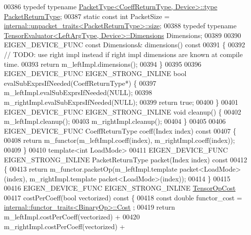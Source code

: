 \begin{DoxyCode}
00386   \textcolor{keyword}{typedef} \textcolor{keyword}{typename} \hyperlink{group___sparse_core___module}{PacketType<CoeffReturnType, Device>::type} 
      \hyperlink{group___sparse_core___module}{PacketReturnType};
00387   \textcolor{keyword}{static} \textcolor{keyword}{const} \textcolor{keywordtype}{int} PacketSize = 
      \hyperlink{struct_eigen_1_1internal_1_1unpacket__traits}{internal::unpacket\_traits<PacketReturnType>::size};
00388   \textcolor{keyword}{typedef} \textcolor{keyword}{typename} \hyperlink{struct_eigen_1_1_tensor_evaluator}{TensorEvaluator<LeftArgType, Device>::Dimensions}
       Dimensions;
00389 
00390   EIGEN\_DEVICE\_FUNC \textcolor{keyword}{const} Dimensions& dimensions()\textcolor{keyword}{ const}
00391 \textcolor{keyword}{  }\{
00392     \textcolor{comment}{// TODO: use right impl instead if right impl dimensions are known at compile time.}
00393     \textcolor{keywordflow}{return} m\_leftImpl.dimensions();
00394   \}
00395 
00396   EIGEN\_DEVICE\_FUNC EIGEN\_STRONG\_INLINE \textcolor{keywordtype}{bool} evalSubExprsIfNeeded(CoeffReturnType*) \{
00397     m\_leftImpl.evalSubExprsIfNeeded(NULL);
00398     m\_rightImpl.evalSubExprsIfNeeded(NULL);
00399     \textcolor{keywordflow}{return} \textcolor{keyword}{true};
00400   \}
00401   EIGEN\_DEVICE\_FUNC EIGEN\_STRONG\_INLINE \textcolor{keywordtype}{void} cleanup() \{
00402     m\_leftImpl.cleanup();
00403     m\_rightImpl.cleanup();
00404   \}
00405 
00406   EIGEN\_DEVICE\_FUNC CoeffReturnType coeff(Index index)\textcolor{keyword}{ const}
00407 \textcolor{keyword}{  }\{
00408     \textcolor{keywordflow}{return} m\_functor(m\_leftImpl.coeff(index), m\_rightImpl.coeff(index));
00409   \}
00410   \textcolor{keyword}{template}<\textcolor{keywordtype}{int} LoadMode>
00411   EIGEN\_DEVICE\_FUNC EIGEN\_STRONG\_INLINE PacketReturnType packet(Index index)\textcolor{keyword}{ const}
00412 \textcolor{keyword}{  }\{
00413     \textcolor{keywordflow}{return} m\_functor.packetOp(m\_leftImpl.template packet<LoadMode>(index), m\_rightImpl.template 
      packet<LoadMode>(index));
00414   \}
00415 
00416   EIGEN\_DEVICE\_FUNC EIGEN\_STRONG\_INLINE \hyperlink{class_eigen_1_1_tensor_op_cost}{TensorOpCost}
00417   costPerCoeff(\textcolor{keywordtype}{bool} vectorized)\textcolor{keyword}{ const }\{
00418     \textcolor{keyword}{const} \textcolor{keywordtype}{double} functor\_cost = \hyperlink{struct_eigen_1_1internal_1_1functor__traits}{internal::functor\_traits<BinaryOp>::Cost}
      ;
00419     \textcolor{keywordflow}{return} m\_leftImpl.costPerCoeff(vectorized) +
00420            m\_rightImpl.costPerCoeff(vectorized) +

\end{DoxyCode}

